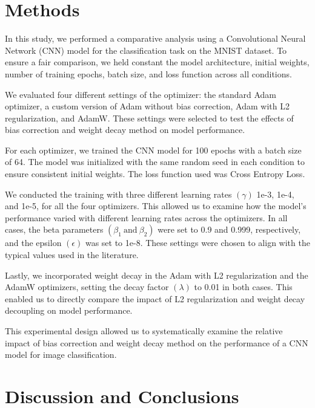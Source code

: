\documentclass[14pt,twocolumn,letterpaper]{extarticle}
\begin{document}
\section{Methods}
In this study, we performed a comparative analysis using a Convolutional Neural Network (CNN) model for the classification task on the MNIST dataset. To ensure a fair comparison, we held constant the model architecture, initial weights, number of training epochs, batch size, and loss function across all conditions.\par
We evaluated four different settings of the optimizer: the standard Adam optimizer, a custom version of Adam without bias correction, Adam with L2 regularization, and AdamW. These settings were selected to test the effects of bias correction and weight decay method on model performance.\par
For each optimizer, we trained the CNN model for 100 epochs with a batch size of 64. The model was initialized with the same random seed in each condition to ensure consistent initial weights. The loss function used was Cross Entropy Loss.\par
We conducted the training with three different learning rates $\left(\gamma\right)$ 1e-3, 1e-4, and 1e-5, for all the four optimizers. This allowed us to examine how the model's performance varied with different learning rates across the optimizers. In all cases, the beta parameters $\left(\beta_{1}\ \text{and}\ \beta_{2}\right)$ were set to 0.9 and 0.999, respectively, and the epsilon $\left(\epsilon\right)$ was set to 1e-8. These settings were chosen to align with the typical values used in the literature.\par
Lastly, we incorporated weight decay in the Adam with L2 regularization and the AdamW optimizers, setting the decay factor $\left(\lambda\right)$ to 0.01 in both cases. This enabled us to directly compare the impact of L2 regularization and weight decay decoupling on model performance.\par
This experimental design allowed us to systematically examine the relative impact of bias correction and weight decay method on the performance of a CNN model for image classification.

\section{Discussion and Conclusions}



% 
\end{document}
